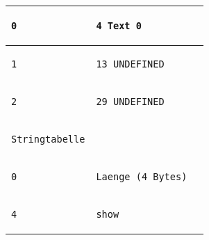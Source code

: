 \documentclass{ti2}
\begin{document}
\begin{tabular}{ | l | l | l|}
\begin{lstlisting}
0
\end{lstlisting} &
\begin{lstlisting}
4 Text 0
\end{lstlisting} &
\begin{lstlisting}
\end{lstlisting} \\ \hline

\begin{lstlisting}
1
\end{lstlisting} &
\begin{lstlisting}
13 UNDEFINED
\end{lstlisting} &
\begin{lstlisting}
\end{lstlisting} \\ \hline

\begin{lstlisting}
2
\end{lstlisting} &
\begin{lstlisting}
29 UNDEFINED
\end{lstlisting} &
\begin{lstlisting}
\end{lstlisting} \\ \hline \hline

\begin{lstlisting}
Stringtabelle
\end{lstlisting} &
\begin{lstlisting}

\end{lstlisting} &
\begin{lstlisting}
\end{lstlisting} \\ \hline

\begin{lstlisting}
0
\end{lstlisting} &
\begin{lstlisting}
Laenge (4 Bytes)
\end{lstlisting} &
\begin{lstlisting}
\end{lstlisting} \\ \hline

\begin{lstlisting}
4
\end{lstlisting} &
\begin{lstlisting}
show
\end{lstlisting} &
\begin{lstlisting}
\end{lstlisting} \\ \hline


\end{tabular}
\end{document}
